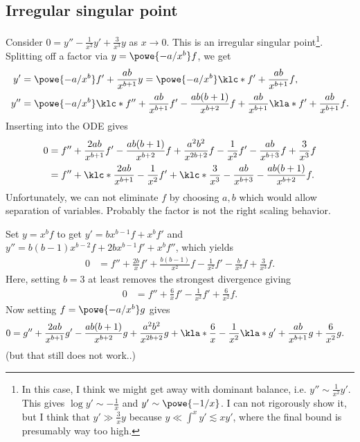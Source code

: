 \documentclass[english, parskip=full]{scrartcl}
\begin{document}
\subsection{Irregular singular point}
Consider $0 = y'' - \frac{1}{x^2} y' + \frac{3}{x^3}y$ as $x\rightarrow 0$.
This is an irregular singular point\footnote{In this case, I think we might get away with dominant balance, i.e. $y'' \sim \frac{1}{x^2} y'$.
This gives $\log y' \sim -\frac{1}{x}$ and $y' \sim \powe{-1/x}$.
I can not rigorously show it, but I think that $y' \gg \frac{3}{x}y$ because $y\ll \int^x y' \lesssim xy'$, where the final bound is presumably way too high.}.
Splitting off a factor via $y=\powe{-a/x^b}f$, we get
\begin{align}
y' &= \powe{-a/x^b} f' + \frac{ab}{x^{b+1}} y = \powe{-a/x^b} \klc*{f' + \frac{ab}{x^{b+1}}f},\\
y'' &= \powe{-a/x^b} \klc*{f'' + \frac{ab}{x^{b+1}} f' - \frac{ab(b+1)}{x^{b+2}}f + \frac{ab}{x^{b+1}} \kla*{f' + \frac{ab}{x^{b+1}}f}}.
\end{align}
Inserting into the ODE gives
\begin{align}
0 &= f'' + \frac{2ab}{x^{b+1}} f' - \frac{ab(b+1)}{x^{b+2}}f + \frac{a^2b^2}{x^{2b+2}} f - \frac{1}{x^2}f' - \frac{ab}{x^{b+3}}f + \frac{3}{x^3}f\\
&= f'' + \klc*{\frac{2ab}{x^{b+1}} - \frac{1}{x^2}}f' + \klc*{\frac{3}{x^3} - \frac{ab}{x^{b+3}} - \frac{ab(b+1)}{x^{b+2}}}f.
\end{align}
Unfortunately, we can not eliminate $f$ by choosing $a,b$ which would allow separation of variables.
Probably the factor is not the right scaling behavior.

Set $y=x^bf$ to get $y'=bx^{b-1}f+x^bf'$ and $y''=b(b-1)x^{b-2} f + 2bx^{b-1} f' + x^bf''$, which yields
\begin{align}
0 &= f'' + \frac{2b}{x}f' + \frac{b(b-1)}{x^2} f - \frac{1}{x^2} f' - \frac{b}{x^3} f + \frac{3}{x^3} f.
\end{align}
Here, setting $b=3$ at least removes the strongest divergence giving
\begin{align}
0 &= f'' + \frac{6}{x} f' - \frac{1}{x^2} f' + \frac{6}{x^2} f.
\end{align}
Now setting $f=\powe{-a/x^b}g$ gives
\begin{align}
0 &= g'' + \frac{2ab}{x^{b+1}} g' - \frac{ab(b+1)}{x^{b+2}}g + \frac{a^2b^2}{x^{2b+2}} g + \kla*{\frac{6}{x} - \frac{1}{x^2}} \kla*{g' + \frac{ab}{x^{b+1}}g} + \frac{6}{x^2} g.
\end{align}
(but that still does not work..)
\end{document}
